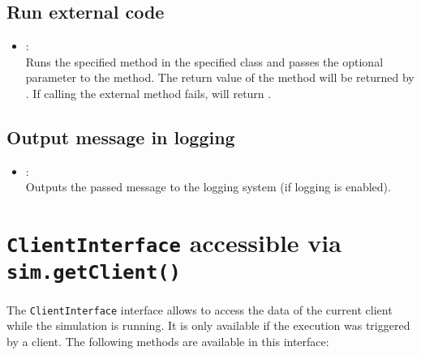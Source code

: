 \section{Run external code}

\begin{itemize}

\item
{}:\\
Runs the specified method in the specified class and passes the optional parameter  to the method.
The return value of the method will be returned by . If calling the external method fails,
 will return .

\end{itemize}

\section{Output message in logging}

\begin{itemize}

\item
{}:\\
Outputs the passed message to the logging system (if logging is enabled).

\end{itemize}



\chapter{\texttt{ClientInterface} accessible via \texttt{sim.getClient()}}

The \texttt{ClientInterface} interface allows to access the data of the current
client while the simulation is running. It is only available if the execution
was triggered by a client. The following methods are available in this interface:


